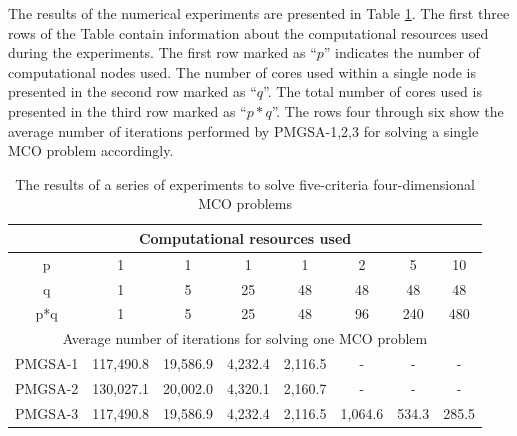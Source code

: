 \documentclass[review]{elsarticle}
\begin{document}
The results of the numerical experiments are presented in Table \ref{tab:2}. The first three rows of the Table contain information about the computational resources used during the experiments. The first row marked as ``$p$'' indicates the number of computational nodes used. The number of cores used within a single node is presented in the second row marked as ``$q$''. The total number of cores used is presented in the third row marked as ``$p*q$''. The rows four through six show the average number of iterations performed by PMGSA-1,2,3 for solving a single MCO problem accordingly.

\begin{table}[ht]
\centering
\caption{The results of a series of experiments to solve five-criteria four-dimensional MCO problems}
\label{tab:2}
\begin{adjustbox}{max width=\textwidth}
\begin{tabular}{cccccccc}
\hline
\multicolumn{8}{c}{Computational resources used}                                                                                                                           \\ \hline
p                   & 1                     & 1                   & 1                  & 1                  & 2                  & 5                  & 10                 \\
q                   & 1                     & 5                   & 25                 & 48                 & 48                 & 48                 & 48                 \\
p*q                 & 1                     & 5                   & 25                 & 48                 & 96                 & 240                & 480                \\ \hline
\multicolumn{8}{c}{Average number of iterations for solving one   MCO problem}                                                                                             \\ \hline
PMGSA-1             & 117,490.8             & 19,586.9            & 4,232.4            & 2,116.5            & -                  & -                  & -                  \\
PMGSA-2             & 130,027.1             & 20,002.0            & 4,320.1            & 2,160.7            & -                  & -                  & -                  \\
PMGSA-3             & 117,490.8             & 19,586.9            & 4,232.4            & 2,116.5            & 1,064.6            & 534.3              & 285.5              \\ \hline

\end{tabular}
\end{adjustbox}
\end{table}
\end{document}

